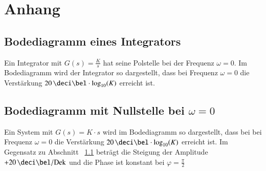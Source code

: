 \section{Anhang}

\subsection{Bodediagramm eines Integrators}
\label{Bodediagramm eines Integrators}

Ein Integrator mit $G(s) = \frac{K}{s}$ hat seine Polstelle bei der Frequenz $\omega = 0$. Im Bodediagramm wird der Integrator so
dargestellt, dass bei Frequenz $\omega = 0$ die Verstärkung $20 \, \deci \bel \cdot \log_{10}(K)$ erreicht ist.



\subsection[Bodediagramm mit Nullstelle bei omega = 0]{Bodediagramm mit Nullstelle bei $\omega = 0$}

Ein System mit $G(s) = K \cdot s$ wird im Bodediagramm so dargestellt, dass bei bei Frequenz $\omega = 0$ die Verstärkung
$20 \, \deci \bel \cdot \log_{10}(K)$ erreicht ist. Im Gegensatz zu Abschnitt ~\ref{Bodediagramm eines Integrators} beträgt die Steigung
der Amplitude $+20 \, \deci \bel / \mathrm{Dek}$ und die Phase ist konstant bei $\varphi = \frac{\pi}{2}$

